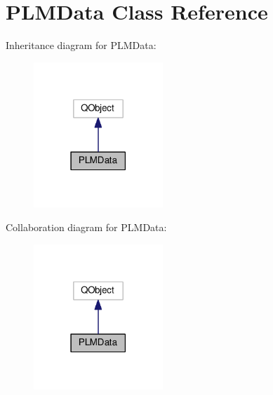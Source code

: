 \hypertarget{class_p_l_m_data}{}\section{P\+L\+M\+Data Class Reference}
\label{class_p_l_m_data}


Inheritance diagram for P\+L\+M\+Data\+:\nopagebreak
\begin{figure}[H]
\begin{center}
\leavevmode
\includegraphics[width=138pt]{class_p_l_m_data__inherit__graph}
\end{center}
\end{figure}


Collaboration diagram for P\+L\+M\+Data\+:\nopagebreak
\begin{figure}[H]
\begin{center}
\leavevmode
\includegraphics[width=138pt]{class_p_l_m_data__coll__graph}
\end{center}
\end{figure}
